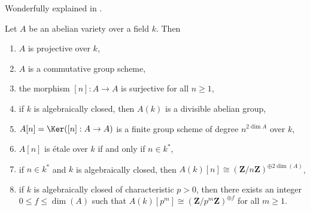 \begin{proposition}
\label{proposition-review-abelian-varieties}
\begin{reference}
Wonderfully explained in \cite{AVar}.
\end{reference}
Let $A$ be an abelian variety over a field $k$. Then
\begin{enumerate}
\item $A$ is projective over $k$,
\item $A$ is a commutative group scheme,
\item the morphism $[n] : A \to A$ is surjective for all $n \geq 1$,
\item if $k$ is algebraically closed, then $A(k)$ is a divisible abelian group,
\item $A[n] = \Ker([n] : A \to A)$ is a finite group scheme of degree
$n^{2\dim A}$ over $k$,
\item $A[n]$ is \'etale over $k$ if and only if $n \in k^*$,
\item if $n \in k^*$ and $k$ is algebraically closed,
then $A(k)[n] \cong (\mathbf{Z}/n\mathbf{Z})^{\oplus 2\dim(A)}$,
\item if $k$ is algebraically closed of characteristic $p > 0$, then
there exists an integer $0 \leq f \leq \dim(A)$ such that
$A(k)[p^m] \cong (\mathbf{Z}/p^m\mathbf{Z})^{\oplus f}$
for all $m \geq 1$.
\end{enumerate}
\end{proposition}

